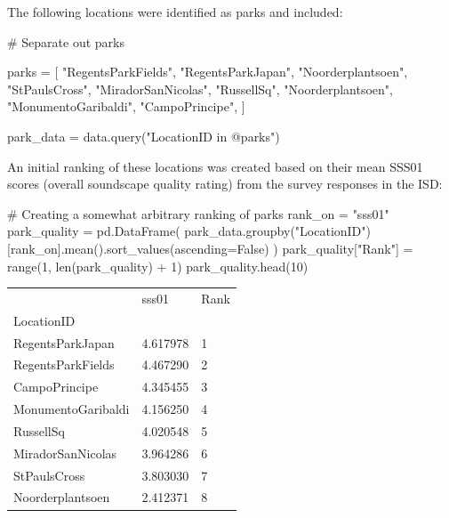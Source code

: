 \documentclass[
  authoryear,
  preprint,
  3p]{elsarticle}
\newenvironment{Shaded}{\begin{snugshade}}{\end{snugshade}}
\newcommand{\BuiltInTok}[1]{\textcolor[rgb]{0.00,0.23,0.31}{#1}}
\newcommand{\CommentTok}[1]{\textcolor[rgb]{0.37,0.37,0.37}{#1}}
\newcommand{\DecValTok}[1]{\textcolor[rgb]{0.68,0.00,0.00}{#1}}
\newcommand{\NormalTok}[1]{\textcolor[rgb]{0.00,0.23,0.31}{#1}}
\newcommand{\OperatorTok}[1]{\textcolor[rgb]{0.37,0.37,0.37}{#1}}
\newcommand{\StringTok}[1]{\textcolor[rgb]{0.13,0.47,0.30}{#1}}
\newcommand{\VariableTok}[1]{\textcolor[rgb]{0.07,0.07,0.07}{#1}}
\begin{document}
The following locations were identified as parks and included:

\begin{Shaded}
\begin{Highlighting}[]
\CommentTok{\# Separate out parks}

\NormalTok{parks }\OperatorTok{=}\NormalTok{ [}
    \StringTok{"RegentsParkFields"}\NormalTok{,}
    \StringTok{"RegentsParkJapan"}\NormalTok{,}
    \StringTok{"Noorderplantsoen"}\NormalTok{,}
    \StringTok{"StPaulsCross"}\NormalTok{,}
    \StringTok{"MiradorSanNicolas"}\NormalTok{,}
    \StringTok{"RussellSq"}\NormalTok{,}
    \StringTok{"Noorderplantsoen"}\NormalTok{,}
    \StringTok{"MonumentoGaribaldi"}\NormalTok{,}
    \StringTok{"CampoPrincipe"}\NormalTok{,}
\NormalTok{]}

\NormalTok{park\_data }\OperatorTok{=}\NormalTok{ data.query(}\StringTok{"LocationID in @parks"}\NormalTok{)}
\end{Highlighting}
\end{Shaded}

An initial ranking of these locations was created based on their mean
SSS01 scores (overall soundscape quality rating) from the survey
responses in the ISD:

\begin{Shaded}
\begin{Highlighting}[]
\CommentTok{\# Creating a somewhat arbitrary ranking of parks}
\NormalTok{rank\_on }\OperatorTok{=} \StringTok{"sss01"}
\NormalTok{park\_quality }\OperatorTok{=}\NormalTok{ pd.DataFrame(}
\NormalTok{    park\_data.groupby(}\StringTok{"LocationID"}\NormalTok{)[rank\_on].mean().sort\_values(ascending}\OperatorTok{=}\VariableTok{False}\NormalTok{)}
\NormalTok{)}
\NormalTok{park\_quality[}\StringTok{"Rank"}\NormalTok{] }\OperatorTok{=} \BuiltInTok{range}\NormalTok{(}\DecValTok{1}\NormalTok{, }\BuiltInTok{len}\NormalTok{(park\_quality) }\OperatorTok{+} \DecValTok{1}\NormalTok{)}
\NormalTok{park\_quality.head(}\DecValTok{10}\NormalTok{)}
\end{Highlighting}
\end{Shaded}

\begin{longtable}[]{@{}lll@{}}
\toprule\noalign{}
& sss01 & Rank \\
LocationID & & \\
\midrule\noalign{}
\endhead
\bottomrule\noalign{}
\endlastfoot
RegentsParkJapan & 4.617978 & 1 \\
RegentsParkFields & 4.467290 & 2 \\
CampoPrincipe & 4.345455 & 3 \\
MonumentoGaribaldi & 4.156250 & 4 \\
RussellSq & 4.020548 & 5 \\
MiradorSanNicolas & 3.964286 & 6 \\
StPaulsCross & 3.803030 & 7 \\
Noorderplantsoen & 2.412371 & 8 \\
\end{longtable}
\end{document}
